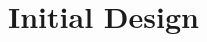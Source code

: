 \documentclass[a4paper,12pt]{article}
\begin{document}
\newpage
%
%




\section{Initial Design}  %


\newpage
%
%
\end{document}
